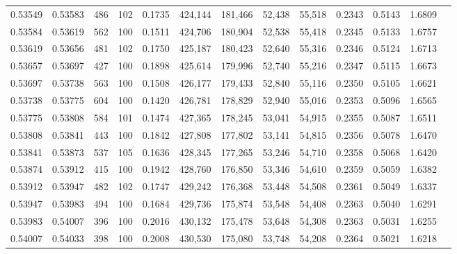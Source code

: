 \begin{tabular}{rrrrrrrrrrrrr}
0.53549 & 0.53583 &   486 & 102 &                                     0.1735 & 424,144 & 181,466 &  52,438 &  55,518 & 0.2343 & 0.5143 & 1.6809 \\
0.53584 & 0.53619 &   562 & 100 &                                     0.1511 & 424,706 & 180,904 &  52,538 &  55,418 & 0.2345 & 0.5133 & 1.6757 \\
0.53619 & 0.53656 &   481 & 102 &                                     0.1750 & 425,187 & 180,423 &  52,640 &  55,316 & 0.2346 & 0.5124 & 1.6713 \\
0.53657 & 0.53697 &   427 & 100 &                                     0.1898 & 425,614 & 179,996 &  52,740 &  55,216 & 0.2347 & 0.5115 & 1.6673 \\
0.53697 & 0.53738 &   563 & 100 &                                     0.1508 & 426,177 & 179,433 &  52,840 &  55,116 & 0.2350 & 0.5105 & 1.6621 \\
0.53738 & 0.53775 &   604 & 100 &                                     0.1420 & 426,781 & 178,829 &  52,940 &  55,016 & 0.2353 & 0.5096 & 1.6565 \\
0.53775 & 0.53808 &   584 & 101 &                                     0.1474 & 427,365 & 178,245 &  53,041 &  54,915 & 0.2355 & 0.5087 & 1.6511 \\
0.53808 & 0.53841 &   443 & 100 &                                     0.1842 & 427,808 & 177,802 &  53,141 &  54,815 & 0.2356 & 0.5078 & 1.6470 \\
0.53841 & 0.53873 &   537 & 105 &                                     0.1636 & 428,345 & 177,265 &  53,246 &  54,710 & 0.2358 & 0.5068 & 1.6420 \\
0.53874 & 0.53912 &   415 & 100 &                                     0.1942 & 428,760 & 176,850 &  53,346 &  54,610 & 0.2359 & 0.5059 & 1.6382 \\
0.53912 & 0.53947 &   482 & 102 &                                     0.1747 & 429,242 & 176,368 &  53,448 &  54,508 & 0.2361 & 0.5049 & 1.6337 \\
0.53947 & 0.53983 &   494 & 100 &                                     0.1684 & 429,736 & 175,874 &  53,548 &  54,408 & 0.2363 & 0.5040 & 1.6291 \\
0.53983 & 0.54007 &   396 & 100 &                                     0.2016 & 430,132 & 175,478 &  53,648 &  54,308 & 0.2363 & 0.5031 & 1.6255 \\
0.54007 & 0.54033 &   398 & 100 &                                     0.2008 & 430,530 & 175,080 &  53,748 &  54,208 & 0.2364 & 0.5021 & 1.6218 \\

\end{tabular}
